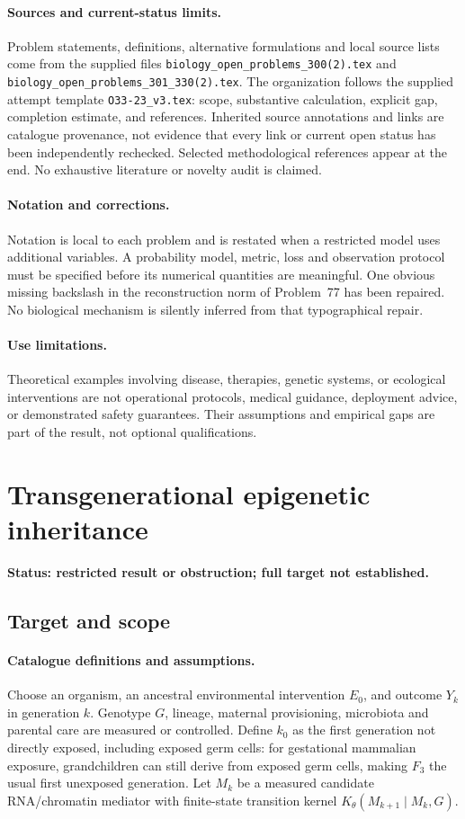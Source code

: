 \documentclass[11pt]{article}
\begin{document}
\paragraph{Sources and current-status limits.}
Problem statements, definitions, alternative formulations and local source lists
come from the supplied files
\texttt{biology\_open\_problems\_300(2).tex} and
\texttt{biology\_open\_problems\_301\_330(2).tex}.
The organization follows the supplied attempt template
\texttt{O33-23\_v3.tex}: scope, substantive calculation, explicit gap,
completion estimate, and references. Inherited source annotations and links are
catalogue provenance, not evidence that every link or current open status has
been independently rechecked. Selected methodological references appear at the
end. No exhaustive literature or novelty audit is claimed.

\paragraph{Notation and corrections.}
Notation is local to each problem and is restated when a restricted model uses
additional variables. A probability model, metric, loss and observation protocol
must be specified before its numerical quantities are meaningful. One obvious
missing backslash in the reconstruction norm of Problem~77 has been repaired.
No biological mechanism is silently inferred from that typographical repair.

\paragraph{Use limitations.}
Theoretical examples involving disease, therapies, genetic systems, or ecological
interventions are not operational protocols, medical guidance, deployment advice,
or demonstrated safety guarantees. Their assumptions and empirical gaps are part
of the result, not optional qualifications.


\section*{Transgenerational epigenetic inheritance}
\label{prob:036}
\noindent\textbf{Status: restricted result or obstruction; full target not established.}
\subsection{Target and scope}
\paragraph{Catalogue definitions and assumptions.}
Choose an organism, an ancestral environmental intervention $E_0$, and outcome $Y_k$ in generation $k$. Genotype $G$, lineage, maternal provisioning, microbiota and parental care are measured or controlled. Define $k_0$ as the first generation not directly exposed, including exposed germ cells: for gestational mammalian exposure, grandchildren can still derive from exposed germ cells, making $F_3$ the usual first unexposed generation. Let $M_k$ be a measured candidate RNA/chromatin mediator with finite-state transition kernel $K_\theta(M_{k+1}\mid M_k,G)$.
\end{document}

